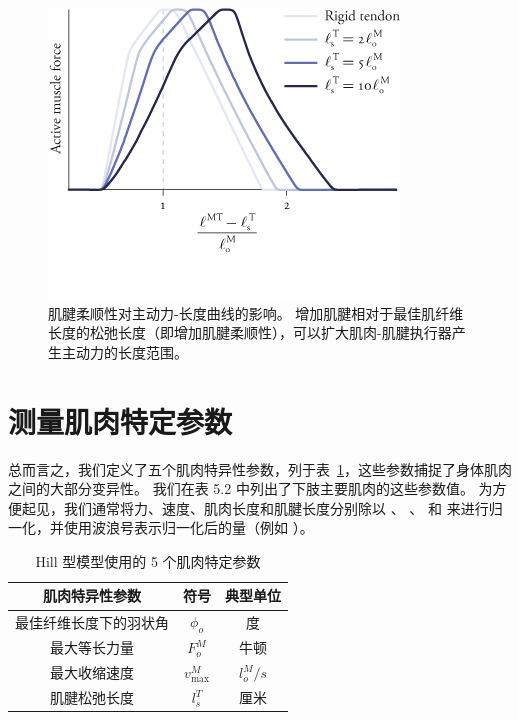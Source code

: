 \begin{figure}[!htb]
	\centering
	\includegraphics[width=0.6\linewidth]{chap5/5_9}
	\caption{肌腱柔顺性对主动力-长度曲线的影响。
		增加肌腱相对于最佳肌纤维长度的松弛长度（即增加肌腱柔顺性），可以扩大肌肉-肌腱执行器产生主动力的长度范围。 \label{fig:5_9}}
\end{figure}


\section{测量肌肉特定参数}

总而言之，我们定义了五个肌肉特异性参数，列于表~\ref{tab:5_1}，这些参数捕捉了身体肌肉之间的大部分变异性。
我们在表 5.2 中列出了下肢主要肌肉的这些参数值。
为方便起见，我们通常将力、速度、肌肉长度和肌腱长度分别除以 、 、 和 来进行归一化，并使用波浪号表示归一化后的量（例如 ）。


\begin{table}[htbp]
	\caption{Hill 型模型使用的 5 个肌肉特定参数} \label{tab:5_1} \centering
	\begin{tabular}{ccc} %
		\toprule
		肌肉特异性参数 & 符号 & 典型单位  \\
		\midrule
		最佳纤维长度下的羽状角 & $\phi_o$ &  度 \\
		\midrule
		最大等长力量 & $F_o^M$ &  牛顿 \\
		\midrule
		最大收缩速度 & $v_\text{max}^M$ &  $l_o^M / s$ \\
		\midrule
		肌腱松弛长度 & $l_s^T$ &  厘米 \\
		\bottomrule
	\end{tabular}
\end{table}


